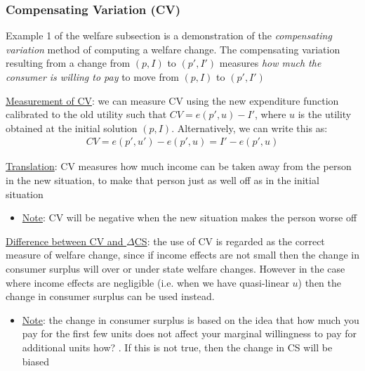 \documentclass{article}
\begin{document}
\subsubsection{Compensating Variation (CV)}
Example 1 of the welfare subsection is a demonstration of the \textit{compensating variation} method of computing a welfare change. The compensating variation resulting from a change from $(p, I)$ to $(p', I')$ measures \textit{how much the consumer is willing to pay} to move from $(p, I)$ to $(p', I')$ \par \vspace{0.3em}
  \underline{Measurement of CV}: we can measure CV using the new expenditure function calibrated to the old utility such that $CV = e(p', u) - I'$, where $u$ is the utility obtained at the initial solution $(p, I)$. Alternatively, we can write this as:
  \begin{gather*}
    CV = e(p',u') - e(p',u) = I' - e(p',u)
  \end{gather*}
  \par
  \underline{Translation}: CV measures how much income can be taken away from the person in the new situation, to make that person just as well off as in the initial situation
  \begin{itemize}
    \item  \underline{Note}: CV will be negative when the new situation makes the person worse off
  \end{itemize}
  \par
  \underline{Difference between CV and $\Delta$CS}: the use of CV is regarded as the correct measure of welfare change, since if income effects are not small then the change in consumer surplus will over or under state welfare changes. However in the case where income effects are negligible (i.e. when we have quasi-linear $u$) then the change in consumer surplus can be used instead.
  \begin{itemize}
    \item  \underline{Note}: the change in consumer surplus is based on the idea that how much you pay for the first few units does not affect your marginal willingness to pay for additional units \begingroup\color{magenta} how? \endgroup. If this is not true, then the change in CS will be biased
  \end{itemize}
  \par
\vspace{6mm}
\end{document}
